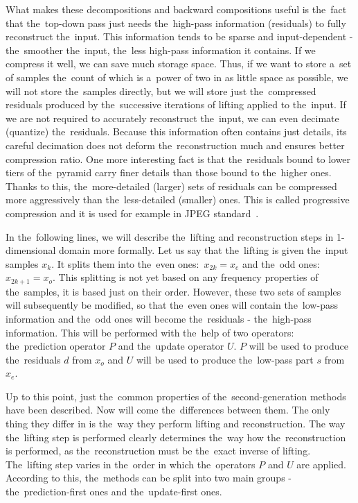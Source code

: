 What makes these decompositions and backward compositions useful is the~fact that the~top-down pass just needs the~high-pass information (residuals) to fully reconstruct the~input. This information tends to be sparse and input-dependent - the~smoother the~input, the~less high-pass information it contains. If we compress it well, we can save much storage space. Thus, if we want to store a~set of samples the~count of which is a~power of two in as little space as possible, we will not store the~samples directly, but we will store just the~compressed residuals produced by the~successive iterations of lifting applied to the~input. If we are not required to accurately reconstruct the~input, we can even decimate (quantize) the~residuals. Because this information often contains just details, its careful decimation does not deform the~reconstruction much and ensures better compression ratio. One more interesting fact is that the~residuals bound to lower tiers of the~pyramid carry finer details than those bound to the~higher ones. Thanks to this, the~more-detailed (larger) sets of residuals can be compressed more aggressively than the~less-detailed (smaller) ones. This is called progressive compression and it is used for example in JPEG standard~\cite{jpeg}.

In the~following lines, we will describe the~lifting and reconstruction steps in 1-dimensional domain more formally.
Let us say that the~lifting is given the~input samples $x_k$. It splits them into the~even ones:~$x_{2k} = x_e$ and the~odd ones:~$x_{2k+1} = x_o$. This splitting is not yet based on any frequency properties of the~samples, it is based just on their order. However, these two sets of samples will subsequently be modified, so that the~even ones will contain the~low-pass information and the~odd ones will become the~residuals - the~high-pass information. This will be performed with the~help of two operators: the~prediction operator $P$ and the~update operator $U$. $P$ will be used to produce the~residuals $d$ from $x_o$ and $U$ will be used to produce the~low-pass part $s$ from $x_e$.

Up to this point, just the~common properties of the~second-generation methods have been described. Now will come the~differences between them. The only thing they differ in is the~way they perform lifting and reconstruction. The way the~lifting step is performed clearly determines the~way how the~reconstruction is performed, as the~reconstruction must be the~exact inverse of lifting. The~lifting step varies in the~order in which the~operators $P$ and $U$ are applied. According to this, the~methods can be split into two main groups - the~prediction-first ones and the~update-first ones.


